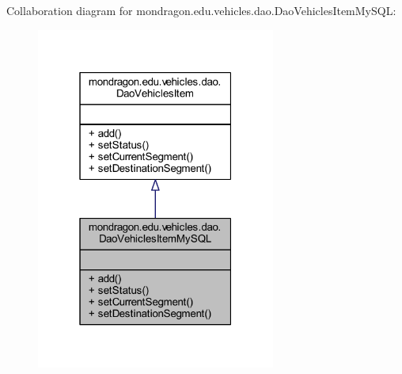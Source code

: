 Collaboration diagram for mondragon.\+edu.\+vehicles.\+dao.\+Dao\+Vehicles\+Item\+My\+S\+QL\+:\nopagebreak
\begin{figure}[H]
\begin{center}
\leavevmode
\includegraphics[width=223pt]{classmondragon_1_1edu_1_1vehicles_1_1dao_1_1_dao_vehicles_item_my_s_q_l__coll__graph}
\end{center}
\end{figure}
